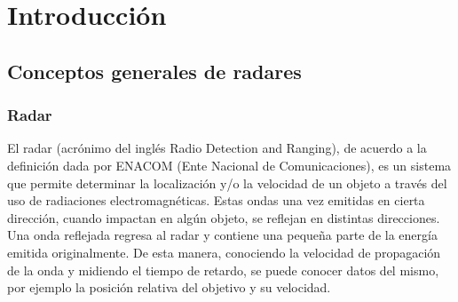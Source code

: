 
\chapter{Introducción} %

\label{Chapter1} %
\label{IntroGeneral}


\newcommand{\keyword}[1]{\textbf{#1}}
\newcommand{\tabhead}[1]{\textbf{#1}}
\newcommand{\code}[1]{\texttt{#1}}
\newcommand{\file}[1]{\texttt{\bfseries#1}}
\newcommand{\option}[1]{\texttt{\itshape#1}}
\newcommand{\grados}{$^{\circ}$}




\section{Conceptos generales de radares}

\subsection{Radar}

El radar (acrónimo del inglés Radio Detection and Ranging), de acuerdo a la definición dada por ENACOM (Ente Nacional de Comunicaciones), es un sistema que permite determinar la localización y/o la velocidad de un objeto a través del uso de radiaciones electromagnéticas. Estas ondas una vez emitidas en cierta dirección, cuando impactan en algún objeto, se reflejan en distintas direcciones. Una onda reflejada regresa al radar y contiene una pequeña parte de la energía emitida originalmente. De esta manera, conociendo la velocidad de propagación de la onda y midiendo el tiempo de retardo, se puede conocer datos del mismo, por ejemplo la posición relativa del objetivo y su velocidad.

